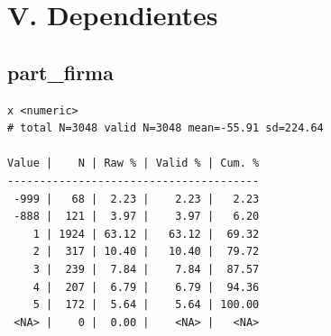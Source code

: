 \documentclass[
  letterpaper,
  DIV=11,
  numbers=noendperiod]{scrreprt}
\newenvironment{Shaded}{\begin{snugshade}}{\end{snugshade}}
\newcommand{\AttributeTok}[1]{\textcolor[rgb]{0.40,0.45,0.13}{#1}}
\newcommand{\CommentTok}[1]{\textcolor[rgb]{0.37,0.37,0.37}{#1}}
\newcommand{\ConstantTok}[1]{\textcolor[rgb]{0.56,0.35,0.01}{#1}}
\newcommand{\DecValTok}[1]{\textcolor[rgb]{0.68,0.00,0.00}{#1}}
\newcommand{\FunctionTok}[1]{\textcolor[rgb]{0.28,0.35,0.67}{#1}}
\newcommand{\NormalTok}[1]{\textcolor[rgb]{0.00,0.23,0.31}{#1}}
\newcommand{\OtherTok}[1]{\textcolor[rgb]{0.00,0.23,0.31}{#1}}
\newcommand{\SpecialCharTok}[1]{\textcolor[rgb]{0.37,0.37,0.37}{#1}}
\newcommand{\StringTok}[1]{\textcolor[rgb]{0.13,0.47,0.30}{#1}}
\begin{document}
\hypertarget{v.-dependientes}{%
\section{V. Dependientes}\label{v.-dependientes}}

\hypertarget{part_firma}{%
\subsection{part\_firma}\label{part_firma}}

\begin{Shaded}
\end{Shaded}

\begin{verbatim}
x <numeric> 
# total N=3048 valid N=3048 mean=-55.91 sd=224.64

Value |    N | Raw % | Valid % | Cum. %
---------------------------------------
 -999 |   68 |  2.23 |    2.23 |   2.23
 -888 |  121 |  3.97 |    3.97 |   6.20
    1 | 1924 | 63.12 |   63.12 |  69.32
    2 |  317 | 10.40 |   10.40 |  79.72
    3 |  239 |  7.84 |    7.84 |  87.57
    4 |  207 |  6.79 |    6.79 |  94.36
    5 |  172 |  5.64 |    5.64 | 100.00
 <NA> |    0 |  0.00 |    <NA> |   <NA>
\end{verbatim}

\begin{Shaded}
\end{Shaded}
\end{document}
